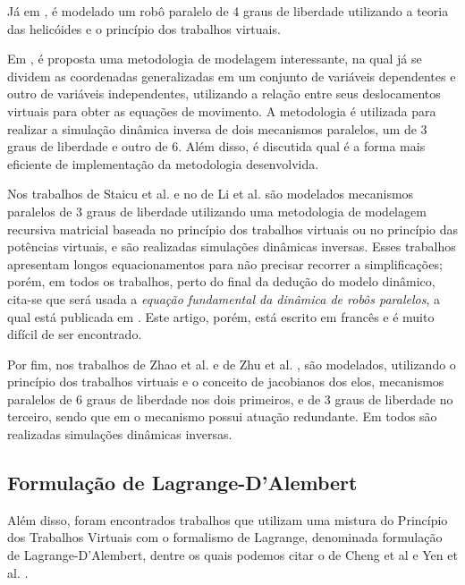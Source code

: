 \documentclass[]{politex}
\begin{document}
Já em \cite{GallardoAlvarado}, é modelado um robô paralelo de 4 graus de liberdade utilizando a teoria das helicóides e o princípio dos trabalhos virtuais.

Em \cite{Geike}, é proposta uma metodologia de modelagem interessante, na qual já se dividem as coordenadas generalizadas em um conjunto de variáveis dependentes e outro de variáveis independentes, utilizando a relação entre seus deslocamentos virtuais para obter as equações de movimento. A metodologia é utilizada para realizar a simulação dinâmica inversa de dois mecanismos paralelos, um de 3 graus de liberdade e outro de 6. Além disso, é discutida qual é a forma mais eficiente de implementação da metodologia desenvolvida.

Nos trabalhos de Staicu et al. \cite{Staicu, Staicu2, Staicu3, StaicuCarpCiocardia, StaicuLiu, StaicuZhang, StaicuZhangRugescu} e no de Li et al. \cite{LiStaicu} são modelados mecanismos paralelos de 3 graus de liberdade utilizando uma metodologia de modelagem recursiva matricial baseada no princípio dos trabalhos virtuais ou no princípio das potências virtuais, e são realizadas simulações dinâmicas inversas. Esses trabalhos apresentam longos equacionamentos para não precisar recorrer a simplificações; porém, em todos os trabalhos, perto do final da dedução do modelo dinâmico, cita-se que será usada a \emph{equação fundamental da dinâmica de robôs paralelos}, a qual está publicada em \cite{StaicuFrances}. Este artigo, porém, está escrito em francês e é muito difícil de ser encontrado.

Por fim, nos trabalhos de Zhao et al. \cite{Zhao, Zhao2} e de Zhu et al. \cite{Zhu}, são modelados, utilizando o princípio dos trabalhos virtuais e o conceito de jacobianos dos elos, mecanismos paralelos de 6 graus de liberdade nos dois primeiros, e de 3 graus de liberdade no terceiro, sendo que em \cite{Zhao2} o mecanismo possui atuação redundante. Em todos são realizadas simulações dinâmicas inversas.

\subsection{Formulação de Lagrange-D’Alembert}

Além disso, foram encontrados trabalhos que utilizam uma mistura do Princípio dos Trabalhos Virtuais com o formalismo de Lagrange, denominada formulação de Lagrange-D’Alembert, dentre os quais podemos citar o de Cheng et al \cite{ChengLiu} e Yen et al. \cite{Yen}.
\end{document}
